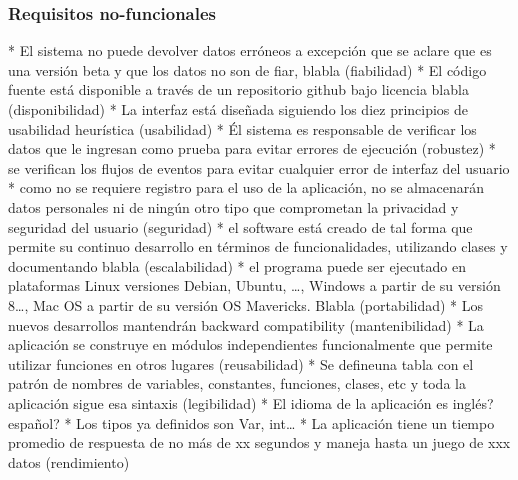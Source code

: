 \subsubsection{Requisitos no-funcionales}
\begin{markdown}
* El sistema no puede devolver datos erróneos a excepción que se aclare que es una versión beta y que los datos no son de fiar, blabla (fiabilidad)
* El código fuente está disponible a través de un repositorio github bajo licencia blabla (disponibilidad)
* La interfaz está diseñada siguiendo los diez principios de usabilidad heurística (usabilidad)
* Él sistema es responsable de verificar los datos que le ingresan como prueba para evitar errores de ejecución (robustez)
* se verifican los flujos de eventos para evitar cualquier error de interfaz del usuario
* como no se requiere registro para el uso de la aplicación, no se almacenarán datos personales ni de ningún otro tipo que comprometan la privacidad y seguridad del usuario (seguridad)
* el software está creado de tal forma que permite su continuo desarrollo en términos de funcionalidades, utilizando clases y documentando blabla (escalabilidad) 
* el programa puede ser ejecutado en plataformas Linux versiones Debian, Ubuntu, …, Windows a partir de su versión 8…, Mac OS a partir de su versión OS Mavericks. Blabla (portabilidad)
* Los nuevos desarrollos mantendrán backward compatibility (mantenibilidad)
* La aplicación se construye en módulos independientes funcionalmente que permite utilizar funciones en otros lugares (reusabilidad)
* Se defineuna tabla con el patrón de nombres de variables, constantes, funciones, clases, etc y toda la aplicación sigue esa sintaxis (legibilidad)
* El idioma de la aplicación es inglés? español?
* Los tipos ya definidos son Var, int…
* La aplicación tiene un tiempo promedio de respuesta de no más de xx segundos y maneja hasta un juego de xxx datos (rendimiento)
\end{markdown}




